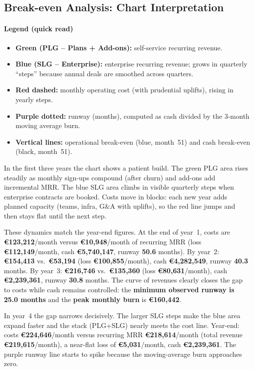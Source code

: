 \subsection{Break-even Analysis: Chart Interpretation}

\paragraph{Legend (quick read)}
\begin{itemize}
  \item \textbf{Green (PLG -- Plans + Add-ons):} self-service recurring revenue.
  \item \textbf{Blue (SLG -- Enterprise):} enterprise recurring revenue; grows in quarterly ``steps'' because annual deals are smoothed across quarters.
  \item \textbf{Red dashed:} monthly operating cost (with prudential uplifts), rising in yearly steps.
  \item \textbf{Purple dotted:} runway (months), computed as cash divided by the 3-month moving average burn.
  \item \textbf{Vertical lines:} operational break-even (blue, month~51) and cash break-even (black, month~51).
\end{itemize}

In the first three years the chart shows a patient build. The green PLG area rises steadily as monthly sign-ups compound (after churn) and add-ons add incremental MRR. The blue SLG area climbs in visible quarterly steps when enterprise contracts are booked. Costs move in blocks: each new year adds planned capacity (teams, infra, G\&A with uplifts), so the red line jumps and then stays flat until the next step.

These dynamics match the year-end figures. At the end of year~1, costs are \textbf{€123{,}212}/month versus \textbf{€10{,}948}/month of recurring MRR (loss \textbf{€112{,}149}/month, cash \textbf{€5{,}740{,}147}, runway \textbf{50.6} months). By year~2: \textbf{€154{,}413} vs.\ \textbf{€53{,}194} (loss \textbf{€100{,}855}/month), cash \textbf{€4{,}282{,}549}, runway \textbf{40.3} months. By year~3: \textbf{€216{,}746} vs.\ \textbf{€135{,}360} (loss \textbf{€80{,}631}/month), cash \textbf{€2{,}239{,}361}, runway \textbf{30.8} months. The curve of revenues clearly closes the gap to costs while cash remains controlled: the \textbf{minimum observed runway is 25.0 months} and the \textbf{peak monthly burn} is \textbf{€160{,}442}.

In year~4 the gap narrows decisively. The larger SLG steps make the blue area expand faster and the stack (PLG+SLG) nearly meets the cost line. Year-end: costs \textbf{€224{,}646}/month versus recurring MRR \textbf{€218{,}614}/month (total revenue \textbf{€219{,}615}/month), a near-flat loss of \textbf{€5{,}031}/month, cash \textbf{€2{,}239{,}361}. The purple runway line starts to spike because the moving-average burn approaches zero.
